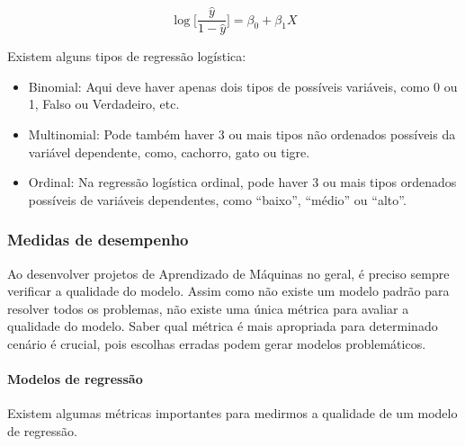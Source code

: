 \documentclass[
  letterpaper,
  DIV=11,
  numbers=noendperiod]{scrreprt}
\let\oldparagraph\paragraph
\renewcommand{\paragraph}[1]{\oldparagraph{#1}\mbox{}}
\begin{document}
\[
\log\bigg[\frac{\hat y}{1- \hat y} \bigg ] = {\beta_0+\beta_1X}
\]

Existem alguns tipos de regressão logística:

\begin{itemize}
\item
  Binomial: Aqui deve haver apenas dois tipos de possíveis variáveis,
  como 0 ou 1, Falso ou Verdadeiro, etc.
\item
  Multinomial: Pode também haver 3 ou mais tipos não ordenados possíveis
  da variável dependente, como, cachorro, gato ou tigre.
\item
  Ordinal: Na regressão logística ordinal, pode haver 3 ou mais tipos
  ordenados possíveis de variáveis \hspace{0pt}\hspace{0pt}dependentes,
  como ``baixo'', ``médio'' ou ``alto''.
\end{itemize}

\hypertarget{medidas-de-desempenho}{%
\subsubsection{Medidas de desempenho}\label{medidas-de-desempenho}}

Ao desenvolver projetos de Aprendizado de Máquinas no geral, é preciso
sempre verificar a qualidade do modelo. Assim como não existe um modelo
padrão para resolver todos os problemas, não existe uma única métrica
para avaliar a qualidade do modelo. Saber qual métrica é mais apropriada
para determinado cenário é crucial, pois escolhas erradas podem gerar
modelos problemáticos.

\hypertarget{modelos-de-regressuxe3o}{%
\paragraph{Modelos de regressão}\label{modelos-de-regressuxe3o}}

Existem algumas métricas importantes para medirmos a qualidade de um
modelo de regressão.
\end{document}
